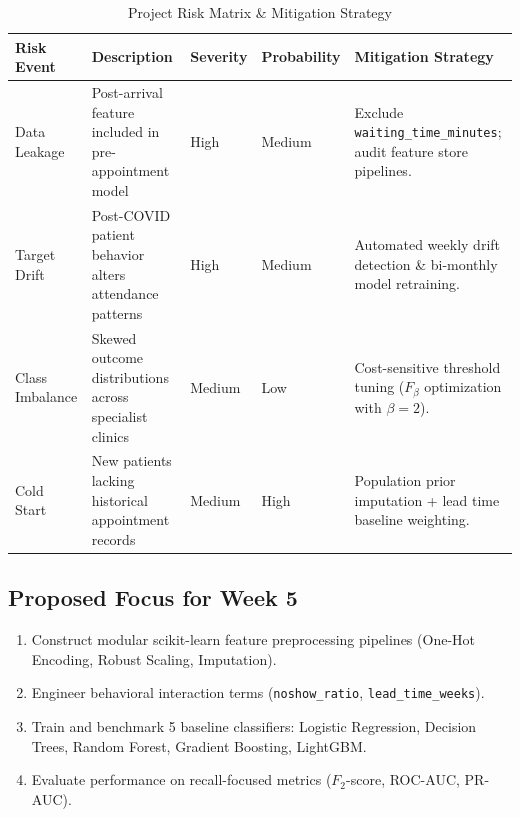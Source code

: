\documentclass[11pt,a4paper]{article}
\begin{document}
\begin{table}[h!]
\centering
\caption{Project Risk Matrix \& Mitigation Strategy}
\label{tab:risk_matrix}
\small
\begin{tabular}{lp{3.5cm}llp{4.5cm}}
\toprule
\textbf{Risk Event} & \textbf{Description} & \textbf{Severity} & \textbf{Probability} & \textbf{Mitigation Strategy} \\
\midrule
Data Leakage & Post-arrival feature included in pre-appointment model & High & Medium & Exclude \texttt{waiting\_time\_minutes}; audit feature store pipelines. \\
Target Drift & Post-COVID patient behavior alters attendance patterns & High & Medium & Automated weekly drift detection \& bi-monthly model retraining. \\
Class Imbalance & Skewed outcome distributions across specialist clinics & Medium & Low & Cost-sensitive threshold tuning ($F_{\beta}$ optimization with $\beta=2$). \\
Cold Start & New patients lacking historical appointment records & Medium & High & Population prior imputation + lead time baseline weighting. \\
\bottomrule
\end{tabular}
\end{table}

\subsection{Proposed Focus for Week 5}
\begin{enumerate}
    \item Construct modular scikit-learn feature preprocessing pipelines (One-Hot Encoding, Robust Scaling, Imputation).
    \item Engineer behavioral interaction terms (\texttt{noshow\_ratio}, \texttt{lead\_time\_weeks}).
    \item Train and benchmark 5 baseline classifiers: Logistic Regression, Decision Trees, Random Forest, Gradient Boosting, LightGBM.
    \item Evaluate performance on recall-focused metrics ($F_2$-score, ROC-AUC, PR-AUC).
\end{enumerate}
\end{document}
